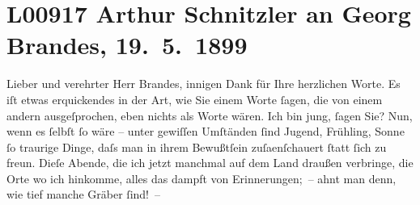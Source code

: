 

\section[Arthur Schnitzler an Georg Brandes, 19. 5. 1899]{L00917 Arthur Schnitzler an Georg Brandes, 19. 5. 1899}
\nopagebreak{}
\rehead{ }\normalsize\beginnumbering{}
\toendnotes[C]{\smallbreak\pagebreak[2]}
\toendnotes[C]{\smallbreak}
\toendnotes[C]{\smallbreak}
\pstart{}{\pb}Lieber und verehrter Herr Brandes,\pend\vspace{0.5em}
\pstart
           innigen Dank für Ihre herzlichen Worte. Es iſt etwas erquickendes in der Art, wie Sie
               einem Worte{ }ſagen, die von einem andern ausgeſprochen, eben nichts als Worte wären.
               Ich bin jung,{ }ſagen Sie? Nun, wenn es{ }ſelbſt{ }ſo wäre – unter gewiſſen Umſtänden{ }ſind
               Jugend, Frühling, Sonne{ }ſo traurige Dinge, daſs man in ihrem Bewußtſein zuſa{\geminationm}enſchauert{ }ſtatt{ }ſich zu {\pb}freun. Dieſe Abende, die ich jetzt manchmal auf
               dem Land draußen verbringe, die Orte wo ich hinkomme, alles das dampft von
               Erinnerungen; – ahnt man denn, wie tief manche Gräber{ }ſind! –\pend
           
